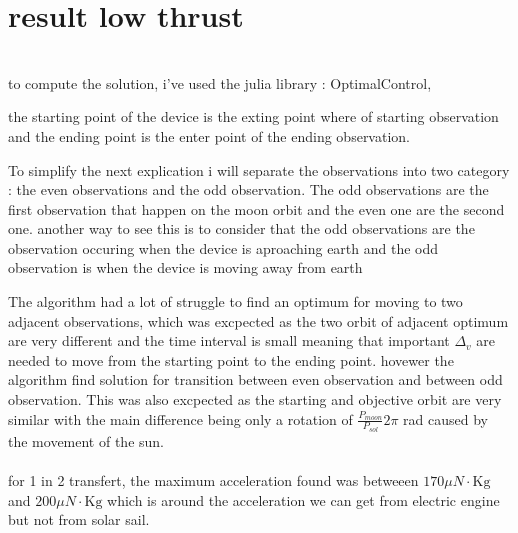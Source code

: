 \documentclass{article} %
\begin{document}
{			\section{result low thrust}
				\\
			to compute the solution, i've used the julia library : OptimalControl,
			
			the starting point of the device is the exting point where of starting observation and the ending point is the enter point of the ending observation.
			
			To simplify the next explication i will separate the observations into two category : the even observations and the odd observation. The odd observations are the first observation that happen on the moon orbit and the even one are the second one. another way to see this is to consider that the odd observations are the observation occuring when the device is aproaching earth and the odd observation is when the device is moving away from earth
			
			The algorithm had a lot of struggle to find an optimum for moving to two adjacent observations, which was excpected as the two orbit of adjacent optimum are very different and the time interval is small meaning that important $\Delta_v$ are needed to move from the starting point to the ending point. hovewer the algorithm find solution for transition between even observation and between odd observation. This was also excpected as the starting and objective orbit are very similar with the main difference being only a rotation of $\frac{P_{moon}}{P_{sol}}2\pi $ rad caused by the movement of the sun.
			\\ \\
			for 1 in 2 transfert, the maximum acceleration found was betweeen $170 \mu{N}\cdot\text{Kg}$ and $200 \mu{N}\cdot\text{Kg}$ which is around the acceleration we can get from electric engine but not from solar sail.
		
}
\end{document}
